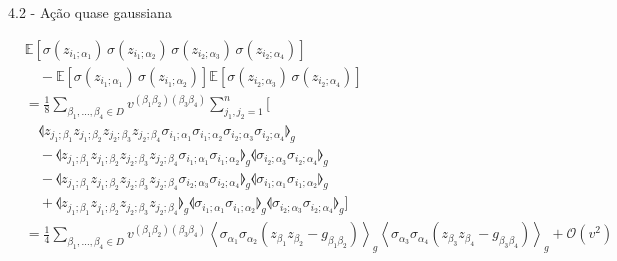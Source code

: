 \documentclass{beamer}
\begin{document}
\begin{frame}{4.2 - Ação quase gaussiana}
    \tiny
    
    \begin{align*}
        &\mathbb{E}\left[\sigma(z_{i_1; \alpha_1})\, \sigma(z_{i_1; \alpha_2})\, \sigma(z_{i_2; \alpha_3})\, \sigma(z_{i_2; \alpha_4})\right] \\
        &\quad - \mathbb{E}\left[\sigma(z_{i_1; \alpha_1})\, \sigma(z_{i_1; \alpha_2})\right] \mathbb{E}\left[\sigma(z_{i_2; \alpha_3})\, \sigma(z_{i_2; \alpha_4})\right] \\
        &= \frac{1}{8} \sum_{\beta_1, \ldots, \beta_4 \in D} v^{(\beta_1 \beta_2)(\beta_3 \beta_4)} \sum_{j_1, j_2 = 1}^{n} \Big[ \\
        &\quad \llangle z_{j_1;\beta_1} z_{j_1;\beta_2} z_{j_2;\beta_3} z_{j_2;\beta_4} \sigma_{i_1;\alpha_1} \sigma_{i_1;\alpha_2} \sigma_{i_2;\alpha_3} \sigma_{i_2;\alpha_4} \rrangle_g \\
        &\quad - \llangle z_{j_1;\beta_1} z_{j_1;\beta_2} z_{j_2;\beta_3} z_{j_2;\beta_4} \sigma_{i_1;\alpha_1} \sigma_{i_1;\alpha_2} \rrangle_g \llangle \sigma_{i_2;\alpha_3} \sigma_{i_2;\alpha_4} \rrangle_g \\
        &\quad - \llangle z_{j_1;\beta_1} z_{j_1;\beta_2} z_{j_2;\beta_3} z_{j_2;\beta_4} \sigma_{i_2;\alpha_3} \sigma_{i_2;\alpha_4} \rrangle_g \llangle \sigma_{i_1;\alpha_1} \sigma_{i_1;\alpha_2} \rrangle_g \\
        &\quad + \llangle z_{j_1;\beta_1} z_{j_1;\beta_2} z_{j_2;\beta_3} z_{j_2;\beta_4} \rrangle_g \llangle \sigma_{i_1;\alpha_1} \sigma_{i_1;\alpha_2} \rrangle_g \llangle \sigma_{i_2;\alpha_3} \sigma_{i_2;\alpha_4} \rrangle_g \Big] \\
        &= \frac{1}{4} \sum_{\beta_1, \ldots, \beta_4 \in D} v^{(\beta_1 \beta_2)(\beta_3 \beta_4)} \left\langle \sigma_{\alpha_1} \sigma_{\alpha_2} (z_{\beta_1} z_{\beta_2} - g_{\beta_1 \beta_2}) \right\rangle_g \left\langle \sigma_{\alpha_3} \sigma_{\alpha_4} (z_{\beta_3} z_{\beta_4} - g_{\beta_3 \beta_4}) \right\rangle_g + \mathcal{O}(v^2)
    \end{align*}
\end{frame}
\end{document}
